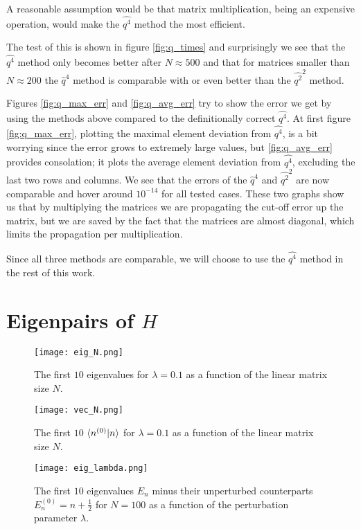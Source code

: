\documentclass[10pt,a4paper,twocolumn]{article}
\begin{document}
A reasonable assumption would be that matrix multiplication, being an expensive operation, would make the $\widehat{q^4}$ method the most efficient.

The test of this is shown in figure \ref{fig:q_times} and surprisingly we see that the $\widehat{q^4}$ method only becomes better after $N \approx 500$ and that for matrices smaller than $N \approx 200$ the $\widehat{q}^4$ method is comparable with or even better than the $\widehat{q^2}^2$ method.

Figures \ref{fig:q_max_err} and \ref{fig:q_avg_err} try to show the error we get by using the methods above compared to the definitionally correct $\widehat{q^4}$. At first figure \ref{fig:q_max_err}, plotting the maximal element deviation from $\widehat{q^4}$, is a bit worrying since the error grows to extremely large values, but \ref{fig:q_avg_err} provides consolation; it plots the average element deviation from $\widehat{q^4}$, excluding the last two rows and columns. We see that the errors of the $\widehat{q}^4$ and $\widehat{q^2}^2$ are now comparable and hover around $10^{-14}$ for all tested cases. These two graphs show us that by multiplying the matrices we are propagating the cut-off error up the matrix, but we are saved by the fact that the matrices are almost diagonal, which limits the propagation per multiplication.

Since all three methods are comparable, we will choose to use the $\widehat{q^4}$ method in the rest of this work.


\section{Eigenpairs of $H$}

\begin{figure}
\centering
\captionsetup{justification=centering}
\texttt{[image: eig\_N.png]}
\caption{The first $10$ eigenvalues for $\lambda=0.1$ as a function of the linear matrix size $N$.}
\label{fig:eig_N}
\end{figure}

\begin{figure}
\centering
\captionsetup{justification=centering}
\texttt{[image: vec\_N.png]}
\caption{The first $10$ $\braket{n^{(0)}|n}$ for $\lambda=0.1$ as a function of the linear matrix size $N$.}
\label{fig:vec_N}
\end{figure}

\begin{figure}
\centering
\captionsetup{justification=centering}
\texttt{[image: eig\_lambda.png]}
\caption{The first $10$ eigenvalues $E_n$ minus their unperturbed counterparts $E_n^{(0)}=n+\frac{1}{2}$ for $N=100$ as a function of the perturbation parameter $\lambda$.}
\label{fig:eig_lambda}
\end{figure}
\end{document}
